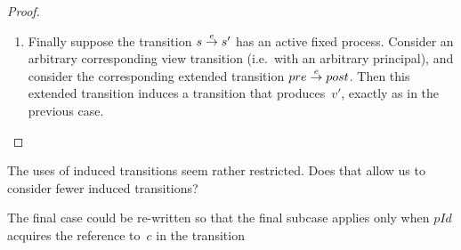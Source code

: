 \begin{proof}
\begin{enumerate}
\item
Finally suppose the transition $s \stackrel{e}\rightarrow s'$ has an active fixed process.
Consider an arbitrary corresponding view transition (i.e.~with an arbitrary
principal), and consider the corresponding extended transition $pre \stackrel{e}\rightarrow
post$.  Then this extended transition induces a transition that produces~$v'$,
exactly as in the previous case.
\end{enumerate}

\end{proof}


\begin{improve}
The uses of induced transitions seem rather restricted.  Does that allow us to
consider fewer induced transitions?  

The final case could be re-written so that the final subcase applies only when
$pId$ acquires the reference to~$c$ in the transition
\end{improve}

